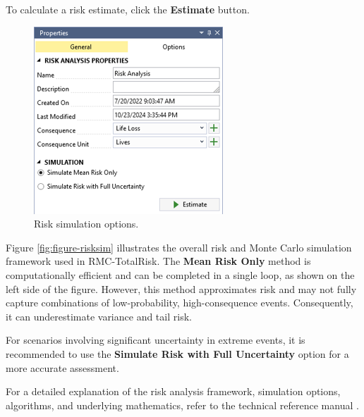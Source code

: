 \documentclass[
]{book}
\begin{document}
To calculate a risk estimate, click the \textbf{Estimate} button.

\begin{figure}

{\centering \includegraphics{images/riskproperties} 

}

\caption{Risk simulation options.}\label{fig:figure-riskprop}
\end{figure}

Figure \ref{fig:figure-risksim} illustrates the overall risk and Monte Carlo simulation framework used in RMC-TotalRisk. The \textbf{Mean Risk Only} method is computationally efficient and can be completed in a single loop, as shown on the left side of the figure. However, this method approximates risk and may not fully capture combinations of low-probability, high-consequence events. Consequently, it can underestimate variance and tail risk.

For scenarios involving significant uncertainty in extreme events, it is recommended to use the \textbf{Simulate Risk with Full Uncertainty} option for a more accurate assessment.

For a detailed explanation of the risk analysis framework, simulation options, algorithms, and underlying mathematics, refer to the technical reference manual \citep{cite-TechRef}.
\end{document}
